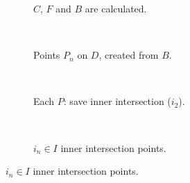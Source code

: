             \begin{figure}
                \centering
                \begin{subfigure}[b]{.5\columnwidth}
                    \centering
                    \begin{tikzpicture}[x=2.5pt,y=2.5pt,scale=0.1
                            ]
                         
                    \end{tikzpicture}
                    \caption{$C$, $F$ and $B$ are calculated.}
                    \label{fig:comp-iter-1}
                \end{subfigure}\\
                \vspace{0.03\textheight}
                \begin{subfigure}[b]{.5\columnwidth}
                    \centering
                    \begin{tikzpicture}[x=2.5pt,y=2.5pt,scale=0.1]
                         
                    \end{tikzpicture}
                    \caption{Points $P_n$ on $D$, created from $B$.}
                    \label{fig:comp-iter-2}
                \end{subfigure}\\
                \vspace{0.03\textheight}
                \begin{subfigure}[b]{.5\columnwidth}
                    \centering
                    \begin{tikzpicture}[x=2.5pt,y=2.5pt,scale=0.1]
                         
                    \end{tikzpicture}
                    \caption{Each $P$: save inner intersection ($i_2$).}
                    \label{fig:comp-iter-3}
                \end{subfigure}\\
                \vspace{0.03\textheight}
                \begin{subfigure}[b]{.5\columnwidth}
                    \centering
                    \begin{tikzpicture}[x=2.5pt,y=2.5pt,scale=0.1
                            ]
                         
                    \end{tikzpicture}
                    \caption{$i_n\in I$ inner intersection points.}
                    \label{fig:comp-iter-4}
                \end{subfigure}


\end{figure}
